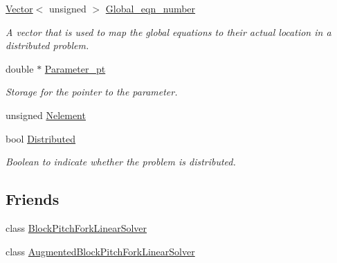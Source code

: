 \begin{DoxyCompactItemize}
\hyperlink{classoomph_1_1Vector}{Vector}$<$ unsigned $>$ \hyperlink{classoomph_1_1PitchForkHandler_ac7010a8c64237d76cb0f23bfad126e07}{Global\+\_\+eqn\+\_\+number}
\begin{DoxyCompactList}\small\item\em A vector that is used to map the global equations to their actual location in a distributed problem. \end{DoxyCompactList}\item 
double $\ast$ \hyperlink{classoomph_1_1PitchForkHandler_aa0e8800d56e68fcb63ec2315f503cab2}{Parameter\+\_\+pt}
\begin{DoxyCompactList}\small\item\em Storage for the pointer to the parameter. \end{DoxyCompactList}\item 
unsigned \hyperlink{classoomph_1_1PitchForkHandler_ac85263fcd40fa913e4bc12c07f6b7343}{Nelement}
\item 
bool \hyperlink{classoomph_1_1PitchForkHandler_ab948b0ac9640e85e8a17f993a764e000}{Distributed}
\begin{DoxyCompactList}\small\item\em Boolean to indicate whether the problem is distributed. \end{DoxyCompactList}\end{DoxyCompactItemize}
\subsection*{Friends}
\begin{DoxyCompactItemize}
\item 
class \hyperlink{classoomph_1_1PitchForkHandler_aba62ac8cc057be07657972adc4a78b45}{Block\+Pitch\+Fork\+Linear\+Solver}
\item 
class \hyperlink{classoomph_1_1PitchForkHandler_a223dd55e02e905ce0ce98e98f50b7e57}{Augmented\+Block\+Pitch\+Fork\+Linear\+Solver}
\end{DoxyCompactItemize}



